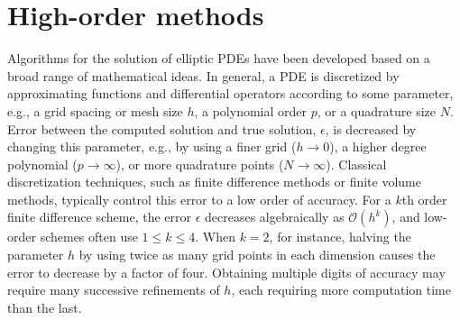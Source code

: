 \section{High-order methods}


Algorithms for the solution of elliptic PDEs have been developed based on a broad range of mathematical ideas. In general, a PDE is discretized by approximating functions and differential operators according to some parameter, e.g., a grid spacing or mesh size $h$, a polynomial order $p$, or a quadrature size $N$. Error between the computed solution and true solution, $\epsilon$, is decreased by changing this parameter, e.g., by using a finer grid ($h \to 0$), a higher degree polynomial ($p \to \infty$), or more quadrature points ($N \to \infty$). Classical discretization techniques, such as finite difference methods or finite volume methods, typically control this error to a low order of accuracy. For a $k$th order finite difference scheme, the error $\epsilon$ decreases algebraically as $\mathcal{O}(h^k)$, and low-order schemes often use $1 \leq k \leq 4$. When $k=2$, for instance, halving the parameter $h$ by using twice as many grid points in each dimension causes the error to decrease by a factor of four. Obtaining multiple digits of accuracy may require many successive refinements of $h$, each requiring more computation time than the last. 


